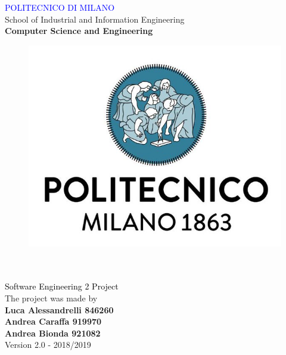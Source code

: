 
\usepackage[dvipsnames]{xcolor}
\usepackage{listings}
\usepackage{alloy-style}
\usepackage{placeins}
\usepackage{graphicx,color,listings}
\usepackage{float}
\usepackage[export]{adjustbox}
\usepackage{hyperref}%
\hypersetup{%
  colorlinks = true,
  linkcolor  = black
}
\usepackage{sectsty}


\sectionfont{\huge}
\subsectionfont{\LARGE}
\subsubsectionfont{\Large}








\begin{titlepage}

\centering
{\textcolor{Blue}{\LARGE  {POLITECNICO DI MILANO}}}\\[0.5CM]
\Large {School of Industrial and Information Engineering}\\[0.3CM]
\textbf{\Large Computer Science and Engineering}\\
[1cm]
\begin{figure}[H]
\centering
\includegraphics[scale = 0.3]{Images/Logo/logo.jpg}\\
[1cm]
\end{figure}
{\fontsize{35}{35} }\\[0.5cm]
{\fontsize{25}{70} }\\[0.5cm]     
{\textcolor{Black}{\LARGE{Software Engineering 2 Project}}}\\ [2cm]     
\centering
The project was made by\\[0.5cm]
\textbf {\LARGE Luca Alessandrelli 846260}\\[0.2cm]
\textbf {\LARGE Andrea Caraffa 919970}\\[0.2cm]
\textbf {\LARGE Andrea Bionda 921082}\\[0.5cm]
Version 2.0  -  2018/2019
\end{titlepage}

